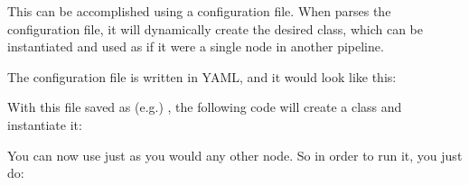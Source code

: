 \documentclass[letterpaper,10pt,english]{sphinxmanual}
\begin{document}
This can be accomplished using a configuration file. When 
parses the configuration file, it will dynamically create the desired
class, which can be instantiated and used as if it were a single node in
another pipeline.

The configuration file is written in YAML, and it would look like this:

%
\begin{sphinxVerbatim}[commandchars=\\\{\}]
 

    
     
       
       
    
     
     
\end{sphinxVerbatim}

With this file saved as (e.g.) , the following code
will create a  class and instantiate it:

%
\begin{sphinxVerbatim}[commandchars=\\\{\}]
   
  
\end{sphinxVerbatim}

You can now use  just as you would any other node. So in
order to run it, you just do:

%
\begin{sphinxVerbatim}[commandchars=\\\{\}]
\end{sphinxVerbatim}
\end{document}
